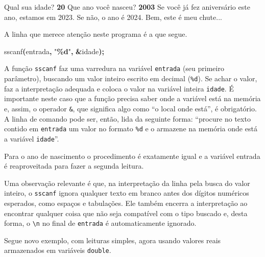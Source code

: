 \documentclass[
  11pt,
  a4paper,
]{scrbook}
\newenvironment{Shaded}{\begin{snugshade}}{\end{snugshade}}
\newcommand{\KeywordTok}[1]{\textcolor[rgb]{0.13,0.29,0.53}{\textbf{#1}}}
\newcommand{\NormalTok}[1]{#1}
\newcommand{\OperatorTok}[1]{\textcolor[rgb]{0.81,0.36,0.00}{\textbf{#1}}}
\newcommand{\SpecialCharTok}[1]{\textcolor[rgb]{0.81,0.36,0.00}{\textbf{#1}}}
\newcommand{\StringTok}[1]{\textcolor[rgb]{0.31,0.60,0.02}{#1}}
\begin{document}
\begin{Shaded}
\begin{Highlighting}[]
\NormalTok{Qual sua idade? }\KeywordTok{ 20 }
\NormalTok{Que ano você nasceu? }\KeywordTok{ 2003 }
\NormalTok{Se você já fez aniversário este ano, estamos em 2023.}
\NormalTok{Se não, o ano é 2024.}
\NormalTok{Bem, este é meu chute...}
\end{Highlighting}
\end{Shaded}

A linha que merece atenção neste programa é a que segue.

\begin{Shaded}
\begin{Highlighting}[]
\NormalTok{sscanf}\OperatorTok{(}\NormalTok{entrada}\OperatorTok{,} \StringTok{"}\SpecialCharTok{\%d}\StringTok{"}\OperatorTok{,} \OperatorTok{\&}\NormalTok{idade}\OperatorTok{);}
\end{Highlighting}
\end{Shaded}

A função \texttt{sscanf} faz uma varredura na variável \texttt{entrada}
(seu primeiro parâmetro), buscando um valor inteiro escrito em decimal
(\texttt{\%d}). Se achar o valor, faz a interpretação adequada e coloca
o valor na variável inteira \texttt{idade}. É importante neste caso que
a função precisa saber onde a variável está na memória e, assim, o
operador \texttt{\&}, que significa algo como ``o local onde está'', é
obrigatório. A linha de comando pode ser, então, lida da seguinte forma:
``procure no texto contido em \texttt{entrada} um valor no formato
\texttt{\%d} e o armazene na memória onde está a variável
\texttt{idade}''.

Para o ano de nascimento o procedimento é exatamente igual e a variável
entrada é reaproveitada para fazer a segunda leitura.

Uma observação relevante é que, na interpretação da linha pela busca do
valor inteiro, o \texttt{sscanf} ignora qualquer texto em branco antes
dos dígitos numéricos esperados, como espaços e tabulações. Ele também
encerra a interpretação ao encontrar qualquer coisa que não seja
compatível com o tipo buscado e, desta forma, o
\texttt{\textbackslash{}n} no final de \texttt{entrada} é
automaticamente ignorado.

Segue novo exemplo, com leituras simples, agora usando valores reais
armazenados em variáveis \texttt{double}.
\end{document}
